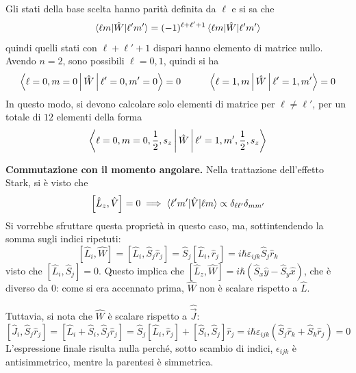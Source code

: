 \documentclass[11pt, a4paper]{scrartcl} %
\numberwithin{equation}{subsection}
\theoremstyle{style2}
\theoremstyle{style1}
\begin{document}
Gli stati della base scelta hanno parit\`a definita da $\ell $ e si sa che 
\[
\braket{\ell m|\hat{W}|\ell 'm'} = (-1)^{\ell  + \ell ' + 1}  \braket{\ell m|\hat{W}|\ell ' m'} 
\] 
quindi quelli stati con $\ell + \ell ' + 1$ dispari hanno elemento di matrice nullo.
Avendo $n=2$, sono possibili $\ell = 0 ,1$, quindi si ha
\[
\Braket{\ell =0, m =0|\hat{W}|\ell '=0, m' = 0} =0 \hspace{1cm} \Braket{\ell =1, m|\hat{W}|\ell ' = 1, m'} =0
\] 
In questo modo, si devono calcolare solo elementi di matrice per $\ell \neq \ell '$, per un totale di $12$ elementi della forma
\[
\Braket{\ell =0,m=0, \frac{1}{2} , s_z|\hat{W}|\ell ' = 1 , m ' , \frac{1}{2}, s_z} 
\] 
\vspace{.5cm}

\noindent \textbf{Commutazione con il momento angolare.} Nella trattazione dell'effetto Stark, si \`e visto che 
\begin{equation}
	\left[ \hat{L}_z , \hat{V} \right]  = 0 \implies \braket{\ell ' m'|\hat{V}|\ell m} \propto \delta _{\ell \ell '} \delta _{mm'} 
\end{equation}
Si vorrebbe sfruttare questa propriet\`a in questo caso, ma, sottintendendo la somma sugli indici ripetuti:
\[
	[\hat{L}_i , \hat{W}] = [\hat{L}_i, \hat{S}_j \hat{r}_j] = \hat{S}_j [\hat{L}_i, \hat{r}_j] = i\hbar \varepsilon _{ijk} \hat{S}_j \hat{r}_k
\] 
visto che $[\hat{L}_i, \hat{S}_j] = 0 $. 
Questo implica che $[\hat{L}_z , \hat{W}] = i \hbar (\hat{S}_x \hat{y} - \hat{S}_y \hat{x})$, che \`e diverso da $0$: come si era accennato prima, $\hat{W}$ non \`e scalare rispetto a $\hat{L}$.

Tuttavia, si nota che $\hat{W}$ \`e scalare rispetto a $\hat{\vec{J}}$:
\[
	[\hat{J}_i, \hat{S}_j \hat{r}_j] = [\hat{L}_i + \hat{S}_i, \hat{S}_j \hat{r}_j] = \hat{S}_j [ \hat{L}_i,\hat{r}_j] + [\hat{S}_i, \hat{S}_j] \hat{r}_j = i\hbar \varepsilon _{ijk} (\hat{S}_j \hat{r}_k + \hat{S}_k \hat{r}_j) = 0
\] 
L'espressione finale risulta nulla perch\'e, sotto scambio di indici, $\epsilon _{ijk} $ \`e antisimmetrico, mentre la parentesi \`e simmetrica.
\end{document}
